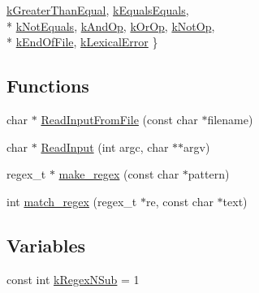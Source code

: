 \begin{DoxyCompactItemize}
\hyperlink{namespacefcal_1_1scanner_a311f0645cd7b770e37cf3fa0ca9dbd60a871e694a205a880ff6074867297747ef}{k\+Greater\+Than\+Equal}, 
\hyperlink{namespacefcal_1_1scanner_a311f0645cd7b770e37cf3fa0ca9dbd60ac3dec923896faf4fb12562794dc00de8}{k\+Equals\+Equals}, 
\\*
\hyperlink{namespacefcal_1_1scanner_a311f0645cd7b770e37cf3fa0ca9dbd60aa9ba3a6e846f06afc0ed7696feb82f3e}{k\+Not\+Equals}, 
\hyperlink{namespacefcal_1_1scanner_a311f0645cd7b770e37cf3fa0ca9dbd60ad1984a19bcb7d57c67382eee6f59b412}{k\+And\+Op}, 
\hyperlink{namespacefcal_1_1scanner_a311f0645cd7b770e37cf3fa0ca9dbd60a0824a6ab5816f3bb7d458d3b83f6df2c}{k\+Or\+Op}, 
\hyperlink{namespacefcal_1_1scanner_a311f0645cd7b770e37cf3fa0ca9dbd60abb5f87456c3386062940acf7b02dba4f}{k\+Not\+Op}, 
\\*
\hyperlink{namespacefcal_1_1scanner_a311f0645cd7b770e37cf3fa0ca9dbd60a43cd62c3648bfe25284cc2a98c3e7e1b}{k\+End\+Of\+File}, 
\hyperlink{namespacefcal_1_1scanner_a311f0645cd7b770e37cf3fa0ca9dbd60a328ecb93e0436e1c69070a23fd0efc00}{k\+Lexical\+Error}
 \}
\end{DoxyCompactItemize}
\subsection*{Functions}
\begin{DoxyCompactItemize}
\item 
char $\ast$ \hyperlink{namespacefcal_1_1scanner_a2f12d1c216757cbb0b88f473b78153a8}{Read\+Input\+From\+File} (const char $\ast$filename)
\item 
char $\ast$ \hyperlink{namespacefcal_1_1scanner_a94e9c0fe390be61ae40c508d3f58ee28}{Read\+Input} (int argc, char $\ast$$\ast$argv)
\item 
regex\+\_\+t $\ast$ \hyperlink{namespacefcal_1_1scanner_a63d6285ad8fb2a40189acc1800418eac}{make\+\_\+regex} (const char $\ast$pattern)
\item 
int \hyperlink{namespacefcal_1_1scanner_af5677bc78768f97c28280d3a113c3258}{match\+\_\+regex} (regex\+\_\+t $\ast$re, const char $\ast$text)
\end{DoxyCompactItemize}
\subsection*{Variables}
\begin{DoxyCompactItemize}
\item 
const int \hyperlink{namespacefcal_1_1scanner_ac3d30107129107b5f2412ab7881c4088}{k\+Regex\+N\+Sub} = 1
\end{DoxyCompactItemize}


